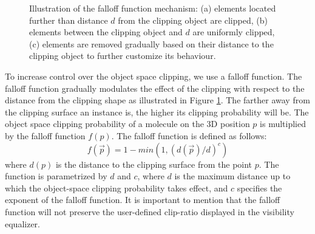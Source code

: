 \begin{figure}[t]
\centering
{}
\caption{\label{fig:falloff} 
Illustration of the falloff function mechanism: (a) elements located further than distance $d$ from the clipping object  are clipped, (b) elements between the clipping object and $d$ are uniformly clipped, (c) elements are removed gradually based on their distance to the clipping object to further customize its behaviour.}
\vspace{-5mm}
\end{figure}


To increase control over the object space clipping, we use a falloff function. 
The falloff function gradually modulates the effect of the clipping with respect to the distance from the clipping shape as illustrated in Figure \ref{fig:falloff}.
The farther away from the clipping surface an instance is, the higher its clipping probability will be.
The object space clipping probability of a molecule on the 3D position $p$ is multiplied by the falloff function $f(p)$. The falloff function is defined as follows:
\begin{equation}
	f(\vec{p}) = 1 - min(1, (d(\vec{p}) / d) ^ c)
\end{equation}
where $d(p)$ is the distance to the clipping surface from the point $p$. 
The function is parametrized by $d$ and $c$, where $d$ is the maximum distance up to which the object-space clipping probability takes effect, and $c$ specifies the exponent of the falloff function.
It is important to mention that the falloff function will not preserve the user-defined clip-ratio displayed in the visibility equalizer.

